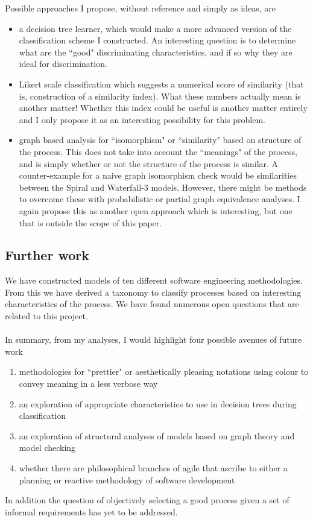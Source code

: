 Possible approaches I propose, without reference and simply as ideas, are
\begin{itemize}
  \item a decision tree learner, which would make a more advanced version of
  the classification scheme I constructed. An interesting question is to
  determine what are the ``good" discriminating characteristics, and if so why
  they are ideal for discrimination.
  \item Likert scale classification which suggests a numerical score of
  similarity (that is, construction of a similarity index).
  What these numbers actually mean is another matter!
  Whether this index could be useful is another matter entirely and I only
  propose it as an interesting possibility for this problem.
  \item graph based analysis for ``isomorphism" or ``similarity" based on
  structure of the process. This does not take into account the ``meanings"
  of the process, and is simply whether or not the structure of the process is
  similar.
  A counter-example for a naive graph isomorphism check would be similarities
  between the Spiral and Waterfall-3 models.
  However, there might be methods to overcome these with probabilistic or
  partial graph equivalence analyses.
  I again propose this as another open approach which is interesting, but one
  that is outside the scope of this paper.
\end{itemize}

\subsection{Further work}

We have constructed models of ten different software engineering
methodologies.
From this we have derived a taxonomy to classify processes based on interesting
characteristics of the process.
We have found numerous open questions that are related to this project.\\
\\
In summary, from my analyses, I would highlight four possible avenues of future
work
\begin{enumerate}
  \item methodologies for ``prettier" or aesthetically pleasing notations using
  colour to convey meaning in a less verbose way
  \item an exploration of appropriate characteristics to use in decision trees
  during classification
  \item an exploration of structural analyses of models based on graph theory
  and model checking
  \item whether there are philosophical branches of agile that ascribe to
  either a planning or reactive methodology of software development
\end{enumerate}

In addition the question of objectively selecting a good process given a set of
informal requirements has yet to be addressed.
